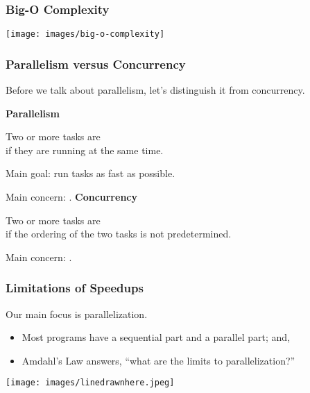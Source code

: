 \begin{frame}
\frametitle{Big-O Complexity}
\begin{center}
	\texttt{[image: images/big-o-complexity]}
\end{center}

\end{frame}
\begin{frame}
  \frametitle{Parallelism versus Concurrency}

  Before we talk about parallelism, let's distinguish it from concurrency.

  {\bf Parallelism}

  Two or more tasks are \\ \hspace*{2em} if they are running at the same time. 

  Main goal: run tasks as fast as possible. 

  Main concern: .
  \vfill
  {\bf Concurrency}

  Two or more tasks are \\ \hspace*{2em} if the ordering of the two tasks is not 
  predetermined. 

  Main concern: .

\end{frame}

\begin{frame}
  \frametitle{Limitations of Speedups}

    Our main focus is parallelization.\\[1em]
  \begin{itemize}
    \item Most programs have a sequential part and a parallel part; and,\\[1em]
    \item Amdahl's Law answers, ``what are the limits to parallelization?''
  \end{itemize}
  
  \begin{center}
	\texttt{[image: images/linedrawnhere.jpeg]}
\end{center}

\end{frame}



